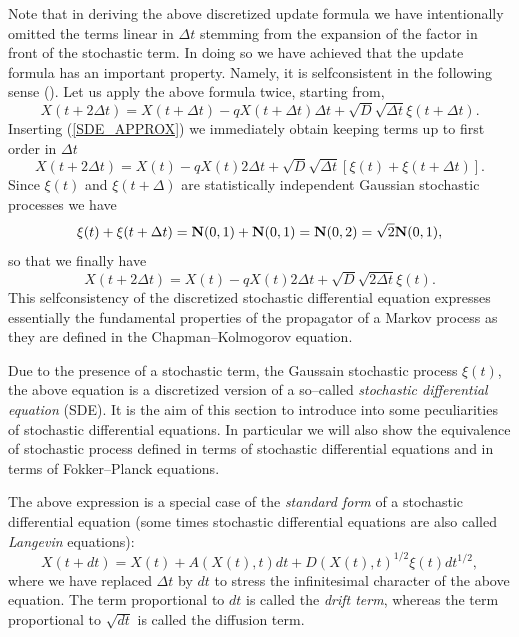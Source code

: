 Note that in deriving the above discretized update formula we have 
intentionally omitted the terms linear in $\Delta t$ stemming from 
the expansion of the factor in front of the stochastic term. In 
doing so we have achieved that the update formula has an important
property. Namely, it is selfconsistent in the following sense
(\cite{GILLESPIE}). Let us apply the above formula twice, starting from,
\begin{equation*}
X(t+2\Delta t) = X(t+\Delta t) 
 - qX(t+ \Delta t) \Delta t + \sqrt{D} \sqrt{\Delta t} \xi(t+\Delta t).
\end{equation*}
Inserting (\ref{SDE_APPROX}) we immediately obtain keeping 
terms up to first order in $\Delta t$
\begin{equation*}
X(t+2 \Delta t) = X(t) - q X(t) 2 \Delta t +
   \sqrt{D} \sqrt{\Delta t} [\xi(t) + \xi(t+\Delta t)].
\end{equation*}
Since $\xi(t)$ and $\xi(t+\Delta)$ are statistically independent
Gaussian stochastic processes we have
\begin{equation*}
\xi(t) + \xi(t+\Delta t) = {\bf N}(0,1) + {\bf N}(0,1) =
  {\bf N}(0,2) = \sqrt{2} {\bf N}(0,1),
\end{equation*}
so that we finally have
\begin{equation*}
X(t+2 \Delta t) = X(t) - q X(t) 2 \Delta t +
   \sqrt{D} \sqrt{2 \Delta t} \xi(t).
\end{equation*}
This selfconsistency of the discretized stochastic differential 
equation expresses essentially the fundamental properties
of the propagator of a Markov process as they are defined in
the Chapman--Kolmogorov equation.


Due to the presence of a stochastic term, the Gaussain stochastic
process $\xi(t)$, the above equation is a discretized version of a 
so--called {\em stochastic differential equation} (SDE). It is the aim
of this section to introduce into some  peculiarities of stochastic
differential equations. In particular we will also show the
equivalence of stochastic process defined in terms of stochastic differential
equations and in terms of Fokker--Planck equations.

The above expression is a special case of the  {\em standard form} of
a stochastic differential equation (some times stochastic
differential equations are also called {\em Langevin} equations):
\begin{equation}
\label{SDE_LANGEVIN_DISCR}
X(t+dt) = X(t) + A(X(t),t)dt + D(X(t),t)^{1/2} \xi(t) dt^{1/2},
\end{equation}
where we have replaced $\Delta t$  by $dt$ to stress the infinitesimal
character of the above equation. The term proportional to $dt$ is
called the {\em drift term}, whereas the term proportional to
$\sqrt{dt}$ is called the diffusion term. 

